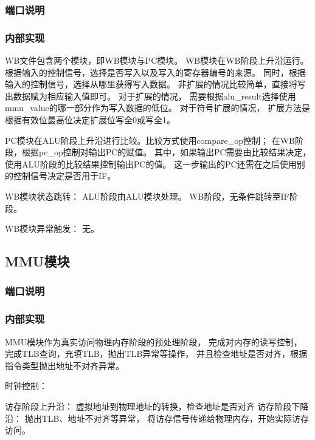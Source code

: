         \subsubsection{端口说明}
            
        \subsubsection{内部实现}
            WB文件包含两个模块，即WB模块与PC模块。%
            WB模块在WB阶段上升沿运行。%
            根据输入的控制信号，选择是否写入以及写入的寄存器编号的来源。%
            同时，根据输入的控制信号，选择从哪里获得写入数据。%
            非扩展的情况比较简单，直接将写出数据赋为相应输入值即可。%
            对于扩展的情况，%
            需要根据alu\_result选择使用mmu\_value的哪一部分作为写入数据的低位。
            对于符号扩展的情况，%
            扩展方法是根据有效位最高位决定扩展位写全0或写全1。
            
            PC模块在ALU阶段上升沿进行比较。比较方式使用compare\_op控制；%
            在WB阶段，根据pc\_op控制对输出PC的赋值。%
            其中，如果输出PC需要由比较结果决定，%
            使用ALU阶段的比较结果控制输出PC的值。%
            这一步输出的PC还需在之后使用别的控制信号决定是否用于IF。

            WB模块状态跳转：%
	        ALU阶段由ALU模块处理。%
	        WB阶段，无条件跳转至IF阶段。

            WB模块异常触发：%
	        无。

    \subsection{MMU模块}
        \subsubsection{端口说明}
            
        \subsubsection{内部实现}
            MMU模块作为真实访问物理内存阶段的预处理阶段，%
            完成对内存的读写控制，%
            完成TLB查询，充填TLB，抛出TLB异常等操作，%
            并且检查地址是否对齐，根据指令类型抛出地址不对齐异常。
            
            时钟控制：
            \begin{minipage}[t]{0.8\linewidth}
                访存阶段上升沿：%
                    虚拟地址到物理地址的转换，检查地址是否对齐%
                访存阶段下降沿：%
                    抛出TLB、地址不对齐等异常，%
                    将访存信号传递给物理内存，开始实际访存访问。%
            \end{minipage}
            
